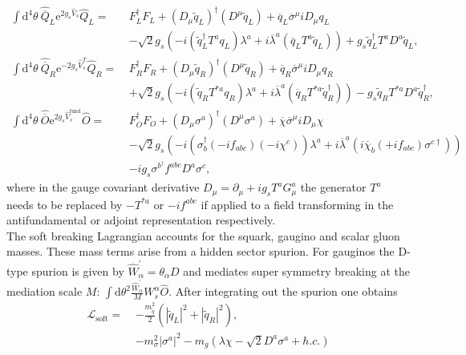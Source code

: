 \begin{align}
\int\mathrm{d}^4\theta\ \hat{\overline{Q}}_L \mathrm{e}^{2g_s\hat{V}_s} \hat{Q}_L =\ & F_L^\dagger F_L + (D_\mu \tilde{q}_L)^\dagger (D^\mu \tilde{q}_L) + \overline{q}_L \overline{\sigma}^\mu i D_\mu q_L\nonumber\\
&-\sqrt{2}g_s \left( -i (\tilde{q}_L^\dagger T^a q_L ) \lambda^a + i \overline{\lambda}^a (\overline{q}_L T^a \tilde{q}_L) \right) + g_s\tilde{q}_L^\dagger T^a D^a \tilde{q}_L,\label{eq:RSQCD_Feynmanrules1}\\
\int\mathrm{d}^4\theta\ \hat{\overline{Q}}_R \mathrm{e}^{-2g_s\hat{V}^T_s} \hat{Q}_R =\  & F_R^\dagger F_R + (D_\mu \tilde{q}_R)^\dagger (D^\mu \tilde{q}_R) + \overline{q}_R \overline{\sigma}^\mu i D_\mu q_R\nonumber\\
&+\sqrt{2}g_s \left( -i (\tilde{q}_R T^{\ast a} q_R ) \lambda^a + i \overline{\lambda}^a (\overline{q}_R T^{\ast a} \tilde{q}_R^\dagger) \right) - g_s \tilde{q}_R T^{\ast a} D^a \tilde{q}_R^\dagger,\label{eq:RSQCD_Feynmanrules2}\\
\int\mathrm{d}^4\theta\ \hat{\overline{O}} \mathrm{e}^{2g_s\hat{V}^{\mathrm{fund}}_s} \hat{O} =\  & F_O^\dagger F_O + (D_\mu \sigma^a)^\dagger (D^\mu \sigma^a) + \overline{\chi} \overline{\sigma}^\mu i D_\mu \chi\nonumber\\
&-\sqrt{2}g_s \left( -i (\sigma_b^\dagger (-if_{abc}) (-i\chi^c) ) \lambda^a + i \overline{\lambda}^a (i\overline{\chi}_b (+if_{abc}) \sigma^{c\dagger}) \right)\nonumber\\
&-ig_s\sigma^{b^\dagger} f^{abc}D^a\sigma^c,
\end{align}
where in the gauge covariant derivative $D_\mu = \partial_\mu +ig_sT^aG^a_\mu$ the generator $T^a$ needs to be replaced by $-T^{\ast a}$ or $-if^{abc}$ if applied to a field transforming in the antifundamental or adjoint representation respectively.\\
The soft breaking Lagrangian accounts for the squark, gaugino and scalar gluon masses. These mass terms arise from a hidden sector spurion. For gauginos the D-type spurion is given by $\hat{W}_\alpha^\prime = \theta_\alpha D$ and mediates super symmetry breaking at the mediation scale $M$: $\int\mathrm{d}\theta^2\frac{\hat{W}_\alpha^\prime}{M}W_s^\alpha \hat{O}$. After integrating out the spurion one obtains\cite{Fox:2002bu, Diessner:2014ksa}
\begin{align}
\mathcal{L}_{\mathrm{soft}} =\ & -\frac{m_{\tilde{q}}^2}{2}(|\tilde{q}_L|^2 + |\tilde{q}_R|^2),\nonumber\\
& -m_{\sigma}^2\left|\sigma^{a}\right|^2 - m_g(\lambda\chi -\sqrt{2}D^a \sigma^a + h.c.)
\end{align}
